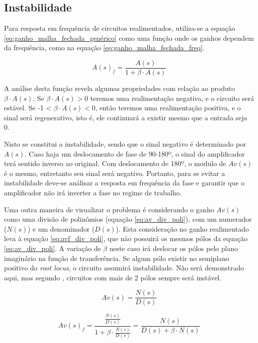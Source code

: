 \documentclass[openright]{normas-utf-tex} %
\begin{document}
\subsection{Instabilidade}

Para resposta em frequência de circuitos realimentados, utiliza-se a equação \ref{eq:ganho_malha_fechada_genérico} como uma função onde os ganhos dependem da frequência, como na equação \ref{eq:ganho_malha_fechada_freq}.  \cite{pedroni,millman}


\begin{equation}\label{eq:ganho_malha_fechada_freq}
A(s)_f = \frac{A(s)}{1+\beta \cdot A(s)}
\end{equation}

A análise desta função revela algumas propriedades com relação ao produto $\beta \cdot A(s)$. Se $\beta \cdot A(s) > 0$ teremos uma realimentação negativa, e o circuito será estável. Se -1 < $\beta \cdot A(s) < 0$, então teremos uma realimentação positiva, e o sinal será regenerativo, isto é, ele continuará a existir mesmo que a entrada seja 0. \cite{pedroni,millman}

Nisto se constitui a instabilidade, sendo que o sinal negativo é determinado por $A(s)$. Caso haja um deslocamento de fase de 90-180º, o sinal do amplificador terá sentido inverso ao original. Com deslocamento de 180º, o modulo de $Av(s)$ é o mesmo, entretanto seu sinal será negativo. Portanto, para se evitar a instabilidade deve-se análisar a resposta em frequência da fase e garantir que o amplificador não irá inverter a fase no regime de trabalho. \cite{pedroni,millman}

Uma outra maneira de visualizar o problema é considerando o ganho $Av(s)$ como uma divisão de polinômios (equação \ref{eq:av_div_poli}), com um numerador ($N(s)$) e um denominador ($D(s)$). Esta consideração no ganho realimentado leva à equação \ref{eq:avf_div_poli}, que não possuirá os mesmos pólos da equação \ref{eq:av_div_poli}. A variação de $\beta$ neste caso irá deslocar os pólos pelo plano imaginário na função de transferência. Se algum pólo existir no semiplano positivo do \textit{root locus}, o circuito assumirá instabilidade. Não será demonstrado aqui, mas segundo , circuitos com mais de 2 pólos sempre será instável.

\begin{equation}\label{eq:av_div_poli}
Av(s) = \frac{N(s)}{D(s)}
\end{equation}


\begin{equation}\label{eq:avf_div_poli}
Av(s)_f = \frac{\frac{N(s)}{D(s)}}{1+\beta \cdot \frac{N(s)}{D(s)}} = \frac{N(s)}{D(s) + \beta \cdot N(s)}
\end{equation}
\end{document}
